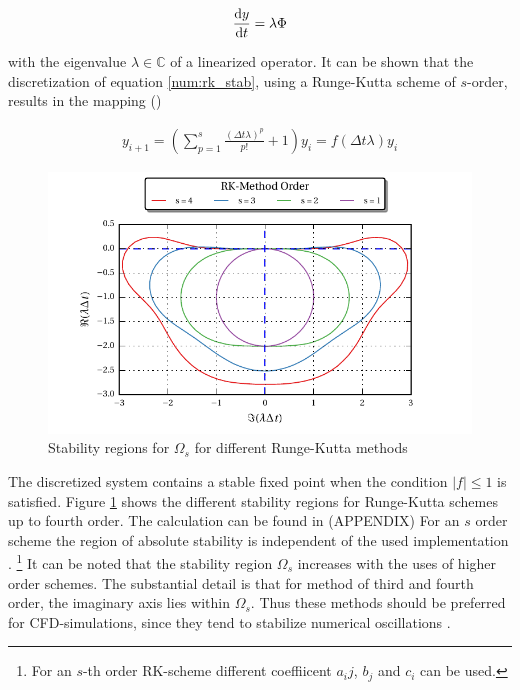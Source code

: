 \begin{align}
\label{num:rk_stab}
\frac{\mathop{}\!\mathrm{d} y}{\mathop{}\!\mathrm{d} t} = \lambda \Phi
\end{align}

with the eigenvalue $\lambda \in \mathbb{C}$ of a linearized operator.
It can be shown that the discretization of equation \ref{num:rk_stab}, using a Runge-Kutta scheme of $s$-order,
results in  the mapping (\citep{BLABLA})

\begin{align}
    y_{i+1}  = \left(\sum_{p=1}^s \frac{(\Delta t \lambda)^p}{p!}  + 1 \right) y_i = f(\Delta t\lambda)y_i
\end{align}

\begin{figure}[!tp]
  \begin{minipage}[c]{0.6\textwidth}
      \includegraphics{gfx/numerik/rk_stability.pdf}
  \end{minipage}\hfill
  \begin{minipage}[c]{0.3\textwidth}
  \caption{Stability regions for $\Omega_s$ for different Runge-Kutta methods}
  \label{fig:num_rkstab}
  \end{minipage}
\end{figure}

The discretized system contains a stable fixed point when the condition $|f|\leq 1$ is satisfied.
Figure \ref{fig:num_rkstab} shows the different stability regions for Runge-Kutta schemes up to fourth order.
The calculation can be found in (APPENDIX)
For an $s$ order scheme the region of absolute stability is independent of the used implementation \citep{canuto2007}.
\footnote{For an $s$-th order RK-scheme different coeffiicent $a_ij$, $b_j$ and $c_i$ can be used.}
It can be noted that the stability region $\Omega_s$ increases with the uses of higher order schemes.
The substantial detail is that for method of third and fourth order, the imaginary axis lies within $\Omega_s$.
Thus these methods should be preferred for  CFD-simulations, since they tend to stabilize numerical oscillations \citep{DIPLOM}.

